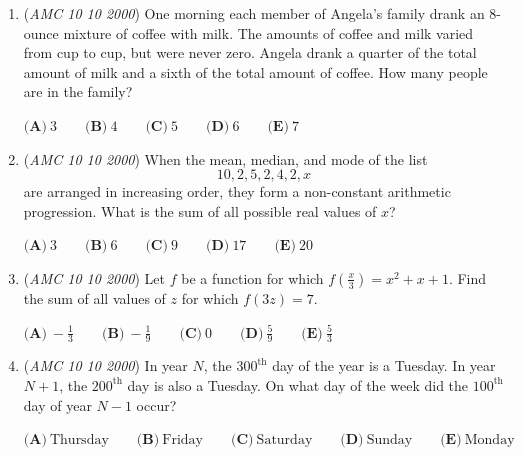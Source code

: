\begin{enumerate}
	\item (\textit{AMC 10 10 2000}) One morning each member of Angela's family drank an 8-ounce mixture of coffee with milk. The amounts of coffee and milk varied from cup to cup, but were never zero. Angela drank a quarter of the total amount of milk and a sixth of the total amount of coffee. How many people are in the family?


 $\textbf{(A)}\ 3 \qquad\textbf{(B)}\ 4 \qquad\textbf{(C)}\ 5 \qquad\textbf{(D)}\ 6 \qquad\textbf{(E)}\ 7$


	\item (\textit{AMC 10 10 2000}) When the mean, median, and mode of the list 
 \[10,2,5,2,4,2,x\] are arranged in increasing order, they form a non-constant arithmetic progression. What is the sum of all possible real values of $x$?


 $\textbf{(A)}\ 3 \qquad\textbf{(B)}\ 6 \qquad\textbf{(C)}\ 9 \qquad\textbf{(D)}\ 17 \qquad\textbf{(E)}\ 20$


	\item (\textit{AMC 10 10 2000}) Let $f$ be a function for which $f\left(\frac{x}{3}\right)=x^2+x+1$. Find the sum of all values of $z$ for which $f(3z)=7$.


 $\textbf{(A)}\ -\frac{1}{3} \qquad\textbf{(B)}\ -\frac{1}{9} \qquad\textbf{(C)}\ 0 \qquad\textbf{(D)}\ \frac{5}{9} \qquad\textbf{(E)}\ \frac{5}{3}$


	\item (\textit{AMC 10 10 2000}) In year $N$, the $300^\text{th}$ day of the year is a Tuesday. In year $N+1$, the $200^\text{th}$ day is also a Tuesday. On what day of the week did the $100^\text{th}$ day of year $N-1$ occur?


 $\textbf{(A)}\ \text{Thursday} \qquad\textbf{(B)}\ \text{Friday} \qquad\textbf{(C)}\ \text{Saturday} \qquad\textbf{(D)}\ \text{Sunday} \qquad\textbf{(E)}\ \text{Monday}$


\end{enumerate}
